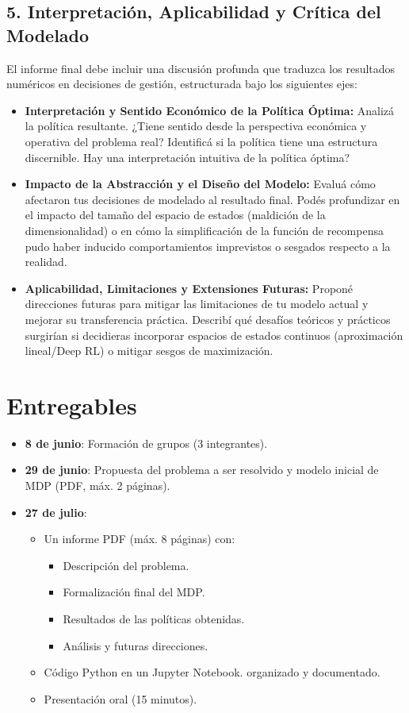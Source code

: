 \documentclass[11pt]{article}
\begin{document}
\subsection*{5. Interpretación, Aplicabilidad y Crítica del Modelado}
El informe final debe incluir una discusión profunda que traduzca los resultados numéricos en decisiones de gestión, estructurada bajo los siguientes ejes:
\begin{itemize}
    \item \textbf{Interpretación y Sentido Económico de la Política Óptima:} Analizá la política resultante. ¿Tiene sentido desde la perspectiva económica y operativa del problema real? Identificá si la pol\'itica tiene una estructura discernible. \textquestiondown Hay una interpretaci\'on intuitiva de la pol\'itica \'optima?
    \item \textbf{Impacto de la Abstracción y el Diseño del Modelo:} Evaluá cómo afectaron tus decisiones de modelado al resultado final. Podés profundizar en el impacto del tamaño del espacio de estados (maldición de la dimensionalidad) o en cómo la simplificación de la función de recompensa pudo haber inducido comportamientos imprevistos o sesgados respecto a la realidad.
    \item \textbf{Aplicabilidad, Limitaciones y Extensiones Futuras:} Proponé direcciones futuras para mitigar las limitaciones de tu modelo actual y mejorar su transferencia práctica. Describí qué desafíos teóricos y prácticos surgirían si decidieras incorporar espacios de estados continuos (aproximación lineal/Deep RL) o mitigar sesgos de maximización.
\end{itemize}

\section*{Entregables}
\begin{itemize}
    \item {\bf 8 de junio}: Formación de grupos (3 integrantes).
    \item {\bf 29 de junio}: Propuesta del problema a ser resolvido y modelo inicial de MDP (PDF, máx. 2 páginas).
    \item {\bf 27 de julio}:
    \begin{itemize}
    \item Un informe PDF (máx. 8 páginas) con:
    \begin{itemize}
        \item Descripción del problema.
        \item Formalización final del MDP.
        \item Resultados de las políticas obtenidas.
        \item Análisis y futuras direcciones.
    \end{itemize}
    \item Código Python en un Jupyter Notebook. organizado y documentado.
    \item Presentación oral (15 minutos).
    \end{itemize}
\end{itemize}
\end{document}

